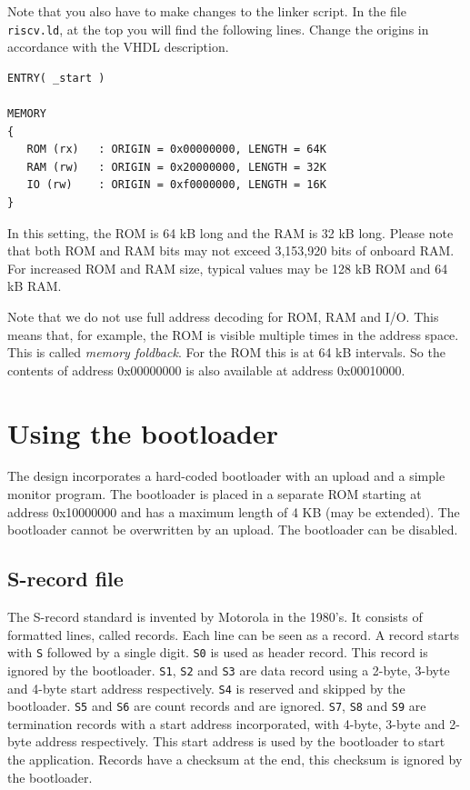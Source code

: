 \documentclass[12pt]{article}
\begin{document}
Note that you also have to make changes to the linker script. In the file \lstinline|riscv.ld|, at the top you will find the following lines. Change the origins in accordance with the VHDL description.

\begin{lstlisting}
ENTRY( _start )

MEMORY
{
   ROM (rx)   : ORIGIN = 0x00000000, LENGTH = 64K
   RAM (rw)   : ORIGIN = 0x20000000, LENGTH = 32K
   IO (rw)    : ORIGIN = 0xf0000000, LENGTH = 16K
}
\end{lstlisting}

In this setting, the ROM is 64 kB long and the RAM is 32 kB long. Please note that both ROM and RAM bits may not exceed 3,153,920 bits of onboard RAM. For increased ROM and RAM size, typical values may be 128 kB ROM and 64 kB RAM.

Note that we do not use full address decoding for ROM, RAM and I/O. This means that, for example, the ROM is visible multiple times in the address space. This is called \emph{memory foldback}. For the ROM this is at 64 kB intervals. So the contents of address 0x00000000 is also available at address 0x00010000.

\section{Using the bootloader}
\label{sec:bootloader}
The design incorporates a hard-coded bootloader with an upload and a simple monitor program. The bootloader is placed in a separate ROM starting at address 0x10000000 and has a maximum length of 4 KB (may be extended). The bootloader cannot be overwritten by an upload. The bootloader can be disabled.

\subsection{S-record file}
The S-record standard is invented by Motorola in the 1980's. It consists of formatted lines, called records. Each line can be seen as a record. A record starts with \lstinline|S| followed by a single digit. \lstinline|S0| is used as header record. This record is ignored by the bootloader. \lstinline|S1|,  \lstinline|S2| and \lstinline|S3| are data record using a 2-byte, 3-byte and 4-byte start address respectively. \lstinline|S4| is reserved and skipped by the bootloader. \lstinline|S5| and \lstinline|S6| are count records and are ignored. \lstinline|S7|, \lstinline|S8| and \lstinline|S9| are termination records with a start address incorporated, with 4-byte, 3-byte and 2-byte address respectively. This start address is used by the bootloader to start the application. Records have a checksum at the end, this checksum is ignored by the bootloader.
\end{document}
